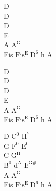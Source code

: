 \begin{chordw}
    D\\
    D\\
    D\\
    E\\
    A $\mathrm{A^{G}}$\\
    Fis $\mathrm{Fis^{E}}$ $\mathrm{D^{6}}$ h A

    D\\
    D\\
    D\\
    E\\
    A $\mathrm{A^{G}}$\\
    Fis $\mathrm{Fis^{E}}$ $\mathrm{D^{6}}$ h A

    D $\mathrm{C^{0}}$ $\mathrm{H^{7}}$\\
    G $\mathrm{F^{0}}$ $\mathrm{E^{0}}$\\
    C $\mathrm{G^{H}}$\\
    $\mathrm{B^{0}}$ $\mathrm{d^{A}}$ $\mathrm{E^{G\#}}$\\
    A $\mathrm{A^{G}}$\\
    Fis $\mathrm{Fis^{E}}$ $\mathrm{D^{6}}$ h A
\end{chordw}
